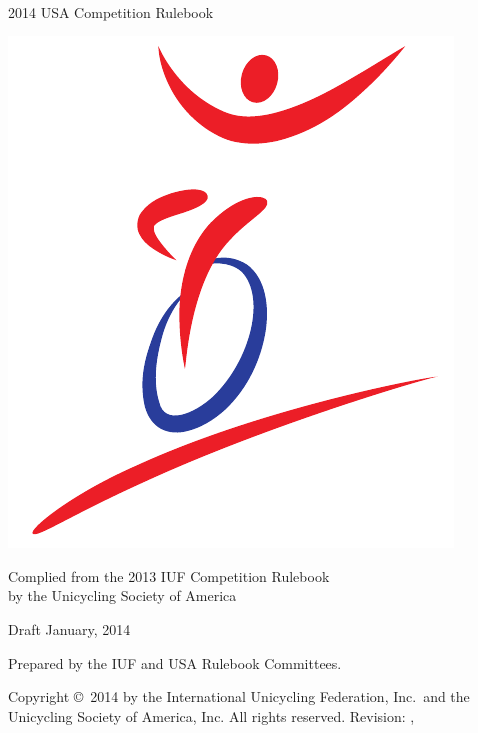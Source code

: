 \documentclass[letterpaper,oneside,parskip=half,numbers=noenddot]{scrbook}
\begin{document}
\begin{titlepage}
\centering
\ \\

{\Huge 2014 USA Competition Rulebook}
\vspace{5mm}

\includegraphics{usa-logo}

\vspace{5mm}
{\Large Complied from the 2013 IUF Competition Rulebook\\ }
\vspace{3mm}
{\Large by the Unicycling Society of America}

\vspace{8mm}
{\Large Draft \quad January, 2014}

\vspace{40mm}
Prepared by the IUF and USA Rulebook Committees.

\vspace{5mm}
{\small Copyright \copyright\ 2014 by the International Unicycling Federation, Inc.\ and the Unicycling Society of America, Inc. All rights reserved.}
\small{Revision: \gitHash, \gitCommitterDate}

\end{titlepage}

\doparttoc
\tableofcontents

\mainmatter










\backmatter
%
\end{document}
